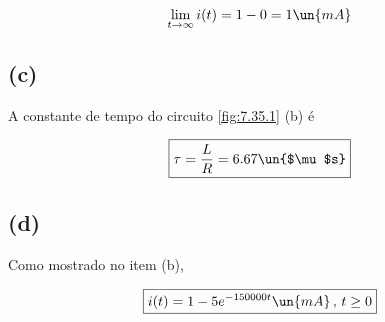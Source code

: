 \[ \displaystyle \lim_{t\to \infty} i(t) = 1 - 0 = 1 \un{mA}  \]

\subsection*{(c)}

A constante de tempo do circuito \ref*{fig:7.35.1} (b) é  

\[ \boxed{\tau = \frac{L}{R} = 6.67 \un{$\mu$s}}  \]

\subsection*{(d)}

Como mostrado no item (b),   

\[ \boxed{i(t) = 1 - 5e^{- 150000t} \un{mA} \, , \, t \geq 0}  \]

























